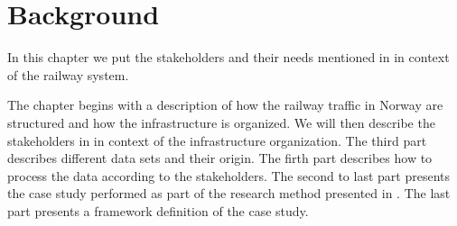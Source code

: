 
\chapter{Background}
\label{chapter:background}
In this chapter we put the stakeholders and their needs mentioned in 
 in context of the railway system. 

The chapter begins with a description of how the railway traffic in Norway
are structured and how the infrastructure is organized. We will then describe
the stakeholders in in context of the infrastructure organization. The third
part describes different data sets and their origin. The firth part describes
how to process the data according to the stakeholders. The second to last part
presents the case study performed as part of the research method presented in
. The last part presents a framework definition of
the case study.






 
